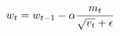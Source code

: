 \documentclass[preview]{standalone}
\begin{document}
\begin{align*}
\special{dvisvgm:raw <g id='unique000'>}w_t = w_{t-1} - \alpha \frac{m_t}{\sqrt{v_t} + \epsilon}\special{dvisvgm:raw </g>}
\end{align*}
\end{document}
